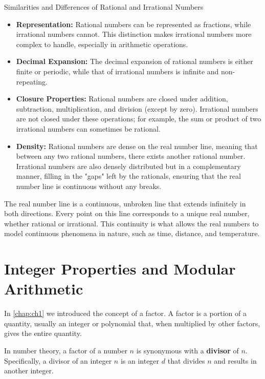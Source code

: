 \begin{custombox}{Similarities and Differences of Rational and Irrational Numbers}
    \begin{itemize}
    \item \textbf{Representation:} Rational numbers can be represented as fractions, while irrational numbers cannot. This distinction makes irrational numbers more complex to handle, especially in arithmetic operations.

    \item \textbf{Decimal Expansion:} The decimal expansion of rational numbers is either finite or periodic, while that of irrational numbers is infinite and non-repeating.

    \item \textbf{Closure Properties:} Rational numbers are closed under addition, subtraction, multiplication, and division (except by zero). Irrational numbers are not closed under these operations; for example, the sum or product of two irrational numbers can sometimes be rational.

    \item \textbf{Density:} Rational numbers are dense on the real number line, meaning that between any two rational numbers, there exists another rational number. Irrational numbers are also densely distributed but in a complementary manner, filling in the "gaps" left by the rationals, ensuring that the real number line is continuous without any breaks.
\end{itemize}
\end{custombox}

The real number line is a continuous, unbroken line that extends infinitely in both directions. Every point on this line corresponds to a unique real number, whether rational or irrational. This continuity is what allows the real numbers to model continuous phenomena in nature, such as time, distance, and temperature.

\section{Integer Properties and Modular Arithmetic}
In \ref{chap:ch1} we introduced the concept of a factor. A factor is a portion of a quantity, usually an integer or polynomial that, when multiplied by other factors, gives the entire quantity.

In number theory, a factor of a number \(n\) is synonymous with a \textbf{divisor} of \(n\). Specifically, a divisor of an integer \(n\) is an integer \(d\) that divides \(n\) and results in another integer.

